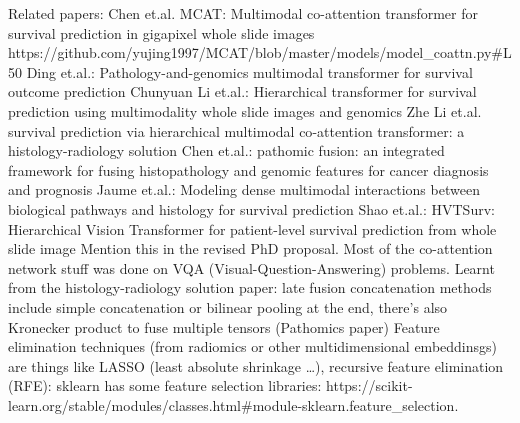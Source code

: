 \documentclass{article}%
\begin{document}
%
Related papers: %
\newline%
\newline%
%
Chen et.al. MCAT: Multimodal co{-}attention transformer for survival prediction in gigapixel whole slide images 	%
\newline%
\newline%
%
https://github.com/yujing1997/MCAT/blob/master/models/model\_coattn.py\#L50 %
\newline%
\newline%
%
Ding et.al.: Pathology{-}and{-}genomics multimodal transformer for survival outcome prediction %
\newline%
\newline%
%
Chunyuan Li et.al.: Hierarchical transformer for survival prediction using multimodality whole slide images and genomics %
\newline%
\newline%
%
Zhe Li et.al. survival prediction via hierarchical multimodal co{-}attention transformer: a histology{-}radiology solution %
\newline%
\newline%
%
Chen et.al.: pathomic fusion: an integrated framework for fusing histopathology and genomic features for cancer diagnosis and prognosis %
\newline%
\newline%
%
Jaume et.al.: Modeling dense multimodal interactions between biological pathways and histology for survival prediction %
\newline%
\newline%
%
Shao et.al.: HVTSurv: Hierarchical Vision Transformer for patient{-}level survival prediction from whole slide image%
\newline%
\newline%
%
Mention this in the revised PhD proposal. Most of the co{-}attention network stuff was done on VQA (Visual{-}Question{-}Answering) problems. %
\newline%
\newline%
%
%
\newline%
\newline%
%
Learnt from the histology{-}radiology solution paper: late fusion concatenation methods include simple concatenation or bilinear pooling at the end, there’s also Kronecker product to fuse multiple tensors (Pathomics paper) %
\newline%
\newline%
%
Feature elimination techniques (from radiomics or other multidimensional embeddinsgs) are things like LASSO (least absolute shrinkage …), recursive feature elimination (RFE): sklearn has some feature selection libraries:  https://scikit{-}learn.org/stable/modules/classes.html\#module{-}sklearn.feature\_selection. %
\end{document}
